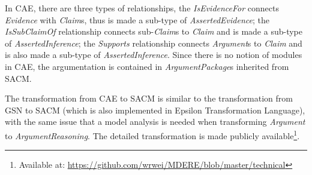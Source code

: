 In CAE, there are three types of relationships, the \textit{IsEvidenceFor} connects \textit{Evidence} with \textit{Claim}s, thus is made a sub-type of \textit{AssertedEvidence}; the \textit{IsSubClaimOf} relationship connects sub-\textit{Claim}s to \textit{Claim} and is made a sub-type of \textit{AssertedInference}; the \textit{Supports} relationship connects \textit{Argument}s to \textit{Claim} and is also made a sub-type of \textit{AssertedInference}. Since there is no notion of modules in CAE, the argumentation is contained in \textit{ArgumentPackage}s inherited from SACM.

The transformation from CAE to SACM is similar to the transformation from GSN to SACM (which is also implemented in Epsilon Transformation Language), with the same issue that a model analysis is needed when transforming \textit{Argument} to \textit{ArgumentReasoning}. The detailed transformation is made publicly available\footnote{Available at: \url{https://github.com/wrwei/MDERE/blob/master/technical}}.



